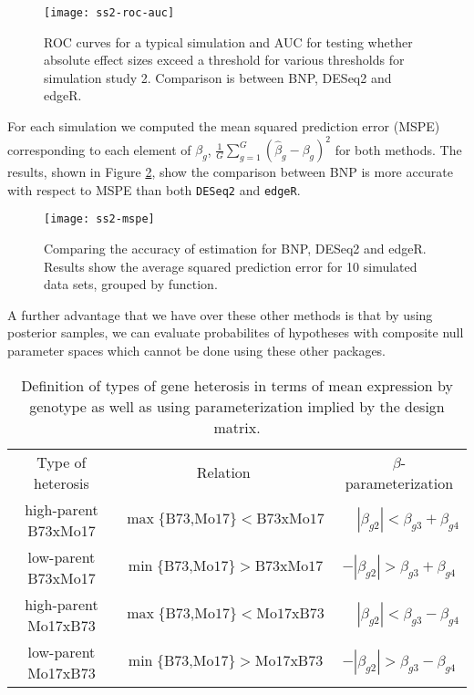\begin{figure}[ht!]
\centering
\texttt{[image: ss2-roc-auc]}
\caption{\small ROC curves for a typical simulation and AUC for testing whether absolute effect sizes exceed a threshold for various thresholds for simulation study 2. Comparison is between BNP, DESeq2 and edgeR.}
\label{ss2-roc}
\end{figure}

For each simulation we computed the mean squared prediction error (MSPE) corresponding to each element of $\beta_g$, $\frac{1}{G}\sum_{g=1}^G (\hat{\beta}_g-\beta_g)^2$ for both methods. The results, shown in Figure \ref{ss2-mspe}, show the comparison between BNP is more accurate with respect to MSPE than both \texttt{DESeq2} and \texttt{edgeR}.

\begin{figure}[ht!]
\centering
\texttt{[image: ss2-mspe]}
\begin{minipage}{.8\textwidth}
\caption{\small Comparing the accuracy of estimation for BNP, DESeq2 and edgeR. Results show the average squared prediction error for 10 simulated data sets, grouped by function.}
\end{minipage}
\label{ss2-mspe}
\end{figure}


A further advantage that we have over these other methods is that by using posterior samples, we can evaluate probabilites of hypotheses with composite null parameter spaces which cannot be done using these other packages.

\begin{table}
\caption{Definition of types of gene heterosis in terms of mean expression by genotype as well as using parameterization implied by the design matrix.}
\label{def-heterosis}
\begin{tabular}{ccc}
Type of heterosis & Relation & $\beta$-parameterization\\
high-parent B73xMo17 & $\max\{\mbox{B73,Mo17}\} < \mbox{B73xMo17}$ & $\phantom{-}|\beta_{g2}| < \beta_{g3} + \beta_{g4}$\\
low-parent B73xMo17  & $\min\{\mbox{B73,Mo17}\} > \mbox{B73xMo17}$ & $-|\beta_{g2}| > \beta_{g3} + \beta_{g4}$\\
high-parent Mo17xB73 & $\max\{\mbox{B73,Mo17}\} < \mbox{Mo17xB73}$ & $\phantom{-}|\beta_{g2}| < \beta_{g3} - \beta_{g4}$\\
low-parent Mo17xB73  & $\min\{\mbox{B73,Mo17}\} > \mbox{Mo17xB73}$ & $-|\beta_{g2}| > \beta_{g3} - \beta_{g4}$
\end{tabular}
\end{table}

